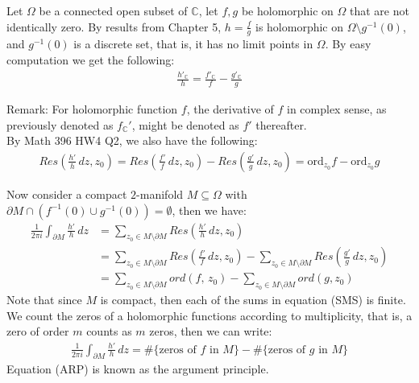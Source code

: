 \documentclass[11pt,oneside]{book}
\theoremstyle{break}
\theoremstyle{break}
\newcommand{\Complex}{\mathbb{C}}
\newcommand{\remark}{\color{blue}Remark: \color{black}}
\begin{document}
Let $\Omega$ be a connected open subset of $\Complex$, let $f,g$ be holomorphic on $\Omega$ that are not identically zero. By results from Chapter 5, $h = \frac{f}{g}$ is holomorphic on $\Omega \setminus g^{-1}(0)$, and $g^{-1}(0)$ is a discrete set, that is, it has no limit points in $\Omega$. By easy computation we get the following:
\begin{align*}
\frac{h'_{\Complex}}{h} = \frac{f'_{\Complex}}{f} -\frac{g'_{\Complex}}{g}
\end{align*}

\remark For holomorphic function $f$, the derivative of $f$ in complex sense, as previously denoted as $f_{\Complex}'$, might be denoted as $f'$ thereafter.\\

By Math 396 HW4 Q2, we also have the following:
\begin{align*}
Res\left(\frac{h'}{h}\, dz, z_0\right) = Res\left(\frac{f'}{f}\, dz, z_0\right) - Res\left(\frac{g'}{g}\, dz, z_0\right)= \text{ord}_{z_0}f - \text{ord}_{z_0}g
\end{align*}

Now consider a compact $2$-manifold $M\subseteq \Omega$ with $\partial M \cap (f^{-1}(0) \cup g^{-1}(0)) = \emptyset$, then we have:
\begin{align*}
\frac{1}{2\pi i}\int_{\partial M}\frac{h'}{h}\, dz &= \sum_{z_0 \in M\setminus \partial M} Res\left(\frac{h'}{h}\, dz, z_0\right) \\
&= \sum_{z_0 \in M\setminus \partial M} Res\left(\frac{f'}{f}\, dz, z_0\right)  - \sum_{z_0 \in M\setminus \partial M} Res\left(\frac{g'}{g}\, dz, z_0\right) \\
&= \sum_{z_0 \in M\setminus \partial M} ord(f,\, z_0) - \sum_{z_0 \in M\setminus \partial M} ord(g,z_0) \tag{SMS}
\end{align*}
Note that since $M$ is compact, then each of the sums in equation (SMS) is finite. We count the zeros of a holomorphic functions according to multiplicity, that is, a zero of order $m$ counts as $m$ zeros, then we can write:
\begin{align*}
\frac{1}{2\pi i}\int_{\partial M}\frac{h'}{h}\, dz = \#\{\text{zeros of }f \text{ in }M\} - \#\{\text{zeros of }g \text{ in }M\} \tag{ARP}
\end{align*}
Equation (ARP) is known as the argument principle. \\
\end{document}
